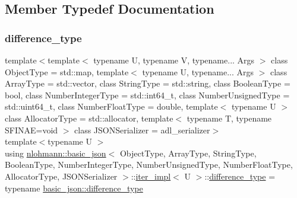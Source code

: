 \subsection{Member Typedef Documentation}
\mbox{\label{classnlohmann_1_1basic__json_1_1iter__impl_aa3d908ee643e5938d32e5f6d261d7715}} 
\subsubsection{\texorpdfstring{difference\_type}{difference\_type}}
{\footnotesize\ttfamily template$<$template$<$ typename U, typename V, typename... Args $>$ class Object\+Type = std\+::map, template$<$ typename U, typename... Args $>$ class Array\+Type = std\+::vector, class String\+Type  = std\+::string, class Boolean\+Type  = bool, class Number\+Integer\+Type  = std\+::int64\+\_\+t, class Number\+Unsigned\+Type  = std\+::uint64\+\_\+t, class Number\+Float\+Type  = double, template$<$ typename U $>$ class Allocator\+Type = std\+::allocator, template$<$ typename T, typename S\+F\+I\+N\+A\+E=void $>$ class J\+S\+O\+N\+Serializer = adl\+\_\+serializer$>$ \\
template$<$typename U $>$ \\
using \mbox{\hyperlink{classnlohmann_1_1basic__json}{nlohmann\+::basic\+\_\+json}}$<$ Object\+Type, Array\+Type, String\+Type, Boolean\+Type, Number\+Integer\+Type, Number\+Unsigned\+Type, Number\+Float\+Type, Allocator\+Type, J\+S\+O\+N\+Serializer $>$\+::\mbox{\hyperlink{classnlohmann_1_1basic__json_1_1iter__impl}{iter\+\_\+impl}}$<$ U $>$\+::\mbox{\hyperlink{classnlohmann_1_1basic__json_1_1iter__impl_aa3d908ee643e5938d32e5f6d261d7715}{difference\+\_\+type}} =  typename \mbox{\hyperlink{classnlohmann_1_1basic__json_afe7c1303357e19cea9527af4e9a31d8f}{basic\+\_\+json\+::difference\+\_\+type}}}



